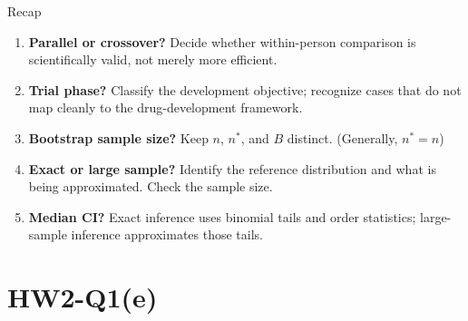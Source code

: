 \documentclass[aspectratio=169,11pt]{beamer}
\begin{document}


\begin{frame}{Recap}
  \begin{enumerate}
    \item \textbf{Parallel or crossover?} Decide whether within-person comparison is
          scientifically valid, not merely more efficient.
    \item \textbf{Trial phase?} Classify the development objective; recognize cases
          that do not map cleanly to the drug-development framework.
    \item \textbf{Bootstrap sample size?} Keep \(n\), \(n^*\), and \(B\) distinct. (Generally, \(n^*=n\))
    \item \textbf{Exact or large sample?} Identify the reference distribution and
          what is being approximated. Check the sample size.
    \item \textbf{Median CI?} Exact inference uses binomial tails and order
          statistics; large-sample inference approximates those tails.
  \end{enumerate}
  \vfill
\end{frame}

\section{HW2-Q1(e)}
\end{document}
